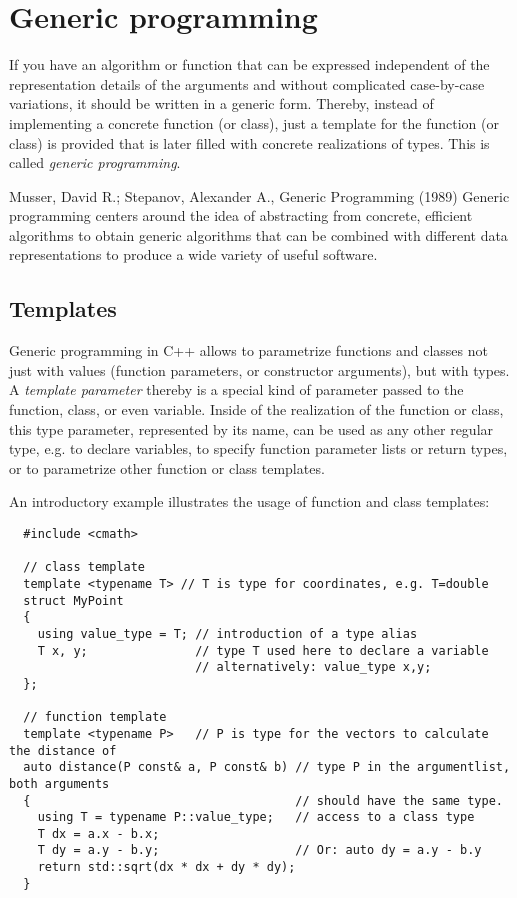 \chapter{Generic programming}
If you have an algorithm or function that can be expressed independent of the representation details of the arguments and without complicated case-by-case
variations, it should be written in a generic form. Thereby, instead of implementing a concrete function (or class), just a template for the function (or class)
is provided that is later filled with concrete realizations of types. This is called \emph{generic programming}.

\begin{zitat}{Musser, David R.; Stepanov, Alexander A., Generic Programming (1989)}
  Generic programming centers around the idea of abstracting from concrete, efficient algorithms to obtain generic algorithms that can be combined with
  different data representations to produce a wide variety of useful software.
\end{zitat}


\section{Templates}
Generic programming in C++ allows to parametrize functions and classes not just with values (function parameters, or constructor arguments), but with types.
A \emph{template parameter} thereby is a special kind of parameter passed to the function, class, or even variable. Inside of the realization of the function
or class, this type parameter, represented by its name, can be used as any other regular type, e.g. to declare variables, to specify function parameter lists
or return types, or to parametrize other function or class templates.

An introductory example illustrates the usage of function and class templates:
\begin{verbatim}
  #include <cmath>

  // class template
  template <typename T> // T is type for coordinates, e.g. T=double
  struct MyPoint
  {
    using value_type = T; // introduction of a type alias
    T x, y;               // type T used here to declare a variable
                          // alternatively: value_type x,y;
  };

  // function template
  template <typename P>   // P is type for the vectors to calculate the distance of
  auto distance(P const& a, P const& b) // type P in the argumentlist, both arguments
  {                                     // should have the same type.
    using T = typename P::value_type;   // access to a class type
    T dx = a.x - b.x;
    T dy = a.y - b.y;                   // Or: auto dy = a.y - b.y
    return std::sqrt(dx * dx + dy * dy);
  }
\end{verbatim}

